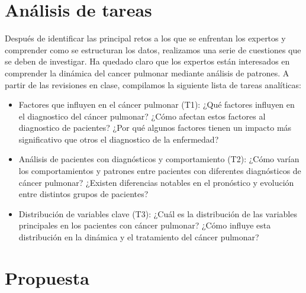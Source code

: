 \documentclass[10pt,journal,compsoc]{IEEEtran}
\begin{document}
\section{Análisis de tareas}
\label{sec:analiticas}
Después de identificar las principal retos a los que se enfrentan los expertos y comprender como se estructuran los datos, realizamos una serie de cuestiones que se deben de investigar. Ha quedado claro que los expertos están interesados en comprender la dinámica del cancer pulmonar mediante análisis de patrones. A partir de las revisiones en clase, compilamos la siguiente lista de tareas analíticas:
\begin{itemize}
\item Factores que influyen en el cáncer pulmonar (T1): ¿Qué factores influyen en el diagnostico del cáncer pulmonar? ¿Cómo afectan estos factores al diagnostico de pacientes? ¿Por qué algunos factores tienen un impacto más significativo que otros el diagnostico de la enfermedad?
\item Análisis de pacientes con diagnósticos y comportamiento (T2): ¿Cómo varían los comportamientos y patrones entre pacientes con diferentes diagnósticos de cáncer pulmonar? ¿Existen diferencias notables en el pronóstico y evolución entre distintos grupos de pacientes?
\item Distribución de variables clave (T3): ¿Cuál es la distribución de las variables principales en los pacientes con cáncer pulmonar? ¿Cómo influye esta distribución en la dinámica y el tratamiento del cáncer pulmonar?
\end{itemize}

\section{Propuesta}
\end{document}
